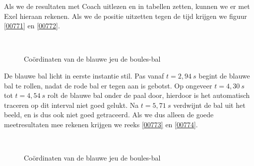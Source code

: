 \documentclass[12pt,a4paper]{article}
\begin{document}
	Als we de resultaten met Coach uitlezen en in tabellen zetten, kunnen we er met Exel hieraan rekenen. Als we de positie uitzetten tegen de tijd krijgen we figuur \ref{00771} en \ref{00772}.
	
	\begin{figure}[H]
		\centering
		\,
		\caption{Co\"{o}rdinaten van de blauwe jeu de boules-bal}
	\end{figure}

	De blauwe bal licht in eerste instantie stil. Pas vanaf $t=2,94\ s$ begint de blauwe bal te rollen, nadat de rode bal er tegen aan is gebotst. Op ongeveer $t=4,30\ s$ tot $t=4,54\ s$ rolt de blauwe bal onder de paal door, hierdoor is het automatisch traceren op dit interval niet goed gelukt. Na $t=5,71\ s$ verdwijnt de bal uit het beeld, en is dus ook niet goed getraceerd. Als we dus alleen de goede meetresultaten mee rekenen krijgen we reeks \ref{00773} en \ref{00774}.
	
	\begin{figure}[H]
		\centering
		\,
		\caption{Co\"{o}rdinaten van de blauwe jeu de boules-bal}
	\end{figure}
\end{document}
